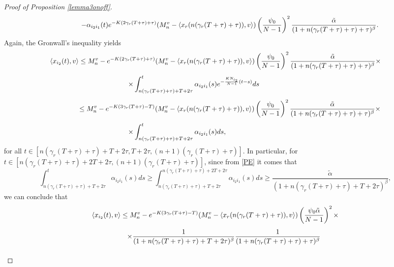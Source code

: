 \documentclass[11pt]{article}
\begin{document}
\begin{proof}[Proof of Proposition \ref{lemma3onoff}]
$$\begin{array}{l}
            \displaystyle{\hspace{1.5cm}-\alpha_{i_2i_1}(t)e^{-K(2\gamma_r(T+\tau)+\tau)}(M_n^v-\langle x_r(n(\gamma_r(T+\tau)+\tau)),v \rangle)\left(\frac{\psi_0}{N-1}\right)^2\frac{\tilde{\alpha}}{(1+n(\gamma_r(T+\tau)+\tau)+\tau)^\beta}.}
		\end{array}$$
		Again, the Gronwall's inequality yields
		$$ \begin{array}{l}
			\vspace{0.3cm}\displaystyle{\langle x_{i_2}(t),v\rangle\leq M^v_n -e^{-K(2\gamma_r(T+\tau)+{\tau})}(M_n^v-\langle x_r(n(\gamma_r(T+\tau)+\tau)),v \rangle)\left(\frac{\psi_0}{N-1}\right)^2\frac{\tilde{\alpha}}{(1+n(\gamma_r(T+\tau)+\tau)+\tau)^\beta}\times}\\
			\vspace{0.3cm}\displaystyle{\hspace{4cm} \times\int_{n(\gamma_r(T+\tau)+\tau)+T+2\tau}^{t}\alpha_{i_2i_1}(s)e^{-\frac{KN_{i_2}}{N-1}(t-s)}ds}\\
			\vspace{0.3cm}\displaystyle{\hspace{1.5cm}\leq M^v_n -e^{-K(3\gamma_r(T+\tau)-T)}(M_n^v-\langle x_r(n(\gamma_r(T+\tau)+\tau)),v \rangle)\left(\frac{\psi_0}{N-1}\right)^2\frac{\tilde{\alpha}}{(1+n(\gamma_r(T+\tau)+\tau)+\tau)^\beta}\times}\\
			\displaystyle{\hspace{4cm}\times\int_{n(\gamma_r(T+\tau)+\tau)+T+2\tau}^{t}\alpha_{i_2i_1}(s)ds,}
		\end{array}$$
		for all $t\in [n(\gamma_r(T+\tau)+\tau)+T+2\tau,T+2\tau,(n+1)(\gamma_r (T+\tau)+\tau)]$. In particular, for $t\in [n(\gamma_r(T+\tau)+\tau)+2T+2\tau,(n+1)(\gamma_r(T+\tau)+\tau)]$, since from \eqref{PE} it comes that
		$$\int_{n(\gamma_r(T+\tau)+\tau)+T+2\tau}^{t}\alpha_{i_2i_1}(s)ds\geq \int_{n(\gamma_r(T+\tau)+\tau)+T+2\tau}^{n(\gamma_r(T+\tau)+\tau)+2T+2\tau}\alpha_{i_2i_1}(s)ds\geq \frac{\tilde\alpha}{(1+n(\gamma_r(T+\tau)+\tau)+T+2\tau)^\beta},$$
		we can conclude that
		\begin{equation}\label{i_2T}
			\begin{array}{l}
				\vspace{0.3cm}\displaystyle{\langle x_{i_2}(t),v\rangle\leq M^v_n-e^{-K(3\gamma_r (T+\tau)-T)}(M_n^v-\langle x_r(n(\gamma_r(T+\tau)+\tau)),v \rangle)\left(\frac{\psi_0\tilde{\alpha}}{N-1}\right)^2\times}\\
				\vspace{0.3cm}\displaystyle{\hspace{1.8cm}\times\frac{1}{(1+n(\gamma_r(T+\tau)+\tau)+T+2\tau)^\beta}\frac{1}{(1+n(\gamma_r(T+\tau)+\tau)+\tau)^\beta}}\\

\end{array}
\end{equation}
\end{proof}
\end{document}
